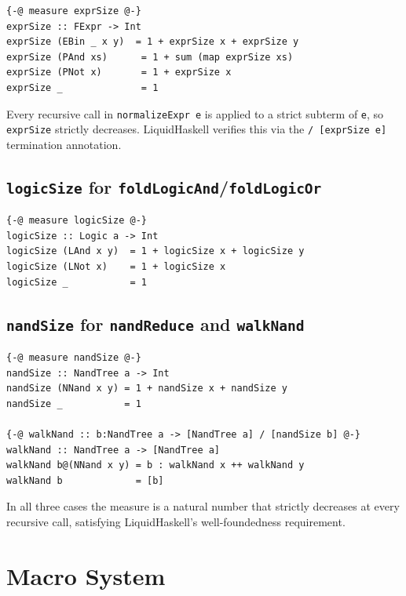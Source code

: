 \documentclass[sigconf,natbib=false]{acmart}
\begin{document}
\begin{lstlisting}[style=haskell,caption={exprSize measure}]
{-@ measure exprSize @-}
exprSize :: FExpr -> Int
exprSize (EBin _ x y)  = 1 + exprSize x + exprSize y
exprSize (PAnd xs)      = 1 + sum (map exprSize xs)
exprSize (PNot x)       = 1 + exprSize x
exprSize _              = 1
\end{lstlisting}

Every recursive call in \texttt{normalizeExpr e} is applied to a strict subterm
of \texttt{e}, so \texttt{exprSize} strictly decreases. LiquidHaskell verifies
this via the \texttt{/ [exprSize e]} termination annotation.

\subsection{\texttt{logicSize} for \texttt{foldLogicAnd}/\texttt{foldLogicOr}}

\begin{lstlisting}[style=haskell,caption={logicSize measure}]
{-@ measure logicSize @-}
logicSize :: Logic a -> Int
logicSize (LAnd x y)  = 1 + logicSize x + logicSize y
logicSize (LNot x)    = 1 + logicSize x
logicSize _           = 1
\end{lstlisting}

\subsection{\texttt{nandSize} for \texttt{nandReduce} and \texttt{walkNand}}

\begin{lstlisting}[style=haskell,caption={nandSize measure and walkNand}]
{-@ measure nandSize @-}
nandSize :: NandTree a -> Int
nandSize (NNand x y) = 1 + nandSize x + nandSize y
nandSize _           = 1

{-@ walkNand :: b:NandTree a -> [NandTree a] / [nandSize b] @-}
walkNand :: NandTree a -> [NandTree a]
walkNand b@(NNand x y) = b : walkNand x ++ walkNand y
walkNand b             = [b]
\end{lstlisting}

In all three cases the measure is a natural number that strictly decreases at
every recursive call, satisfying LiquidHaskell's well-foundedness requirement.


\section{Macro System}
\end{document}
